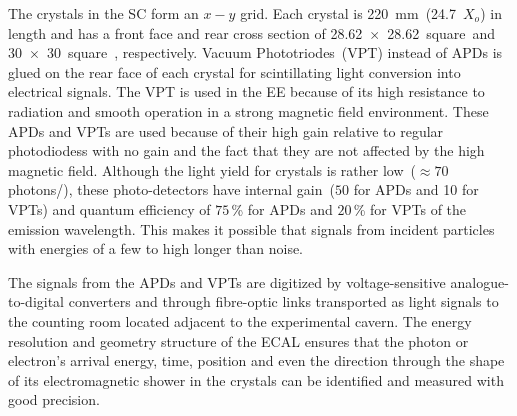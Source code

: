 The crystals in the SC form an $x-y$ grid. Each crystal is 220~mm~(24.7~$X_{o}$) in length and has a front face and rear cross section of 28.62~$\times$~28.62~square~\mm and 30~$\times$~30~square~\mm, respectively. 
Vacuum Phototriodes~(VPT) instead of APDs is glued on the rear face of each crystal for scintillating light  conversion into electrical signals. The VPT is used in the \textsc{EE} because of its high resistance to radiation and smooth operation in a strong magnetic field environment. These APDs and VPTs are used because of their high gain relative to regular photodiodess with no gain and the fact that they are not affected by the high magnetic field. Although the light yield for \pb crystals is rather low~($\approx 70$photons/\MeV), these photo-detectors have internal gain~($50$ for APDs and 10 for VPTs) and quantum efficiency of $75$\,\% for APDs and $20$\,\% for VPTs of the emission wavelength. This makes it possible that signals from incident particles with energies of a few to high \GeV longer than noise.
 
The signals from the APDs and VPTs are digitized by voltage-sensitive analogue-to-digital converters and through fibre-optic links transported as light signals to the counting room located adjacent to the experimental cavern.
\newline
The energy resolution and geometry structure of the ECAL ensures that the photon or electron's arrival energy, time, position and even the direction through the shape of its electromagnetic shower in the crystals can be identified and measured with good precision.


